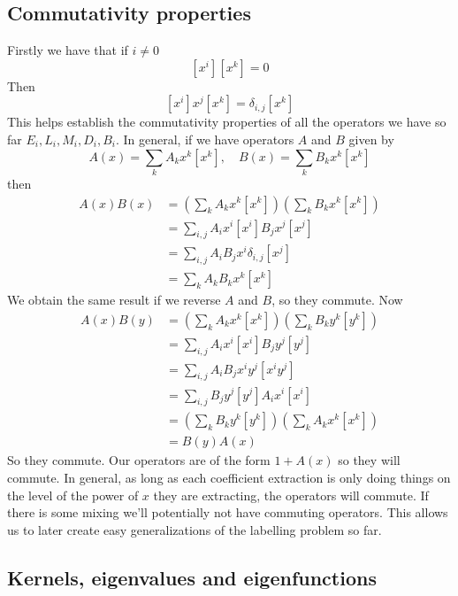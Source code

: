 \documentclass[12pt]{article}
\theoremstyle{definition} \newtheorem{definition}[theorem]{Definition}
\begin{document}
\subsection{Commutativity properties}
Firstly we have that if $i \neq 0$
\[
	[x^i][x^k] = 0
\]
Then
\[
	[x^i]x^j[x^k] = \delta_{i,j}[x^k]
\]
This helps establish the commutativity properties of all the operators we have so far $E_i, L_i, M_i, D_i, B_i$. In general, if we have operators $A$ and $B$ given by
\[
	A(x) = \sum_k A_k x^k[x^k],\quad B(x) = \sum_k B_k x^k[x^k]
\]
then
\begin{align*}
	A(x)B(x) &= \left(\sum_k A_k x^k[x^k]\right)\left(\sum_k B_k x^k[x^k]\right)\\
	& = \sum_{i,j}A_ix^i[x^i]B_jx^j[x^j] \\
	&= \sum_{i,j}A_iB_j x^i\delta_{i,j}[x^j]\\
	&= \sum_k A_kB_k x^k[x^k]
\end{align*}
We obtain the same result if we reverse $A$ and $B$, so they commute. Now
\begin{align*}
	A(x)B(y) &= \left(\sum_k A_k x^k[x^k]\right)\left(\sum_k B_k y^k[y^k]\right)\\
	& = \sum_{i,j}A_ix^i[x^i]B_jy^j[y^j]\\
	& = \sum_{i,j}A_iB_jx^iy^j[x^iy^j]\\
	& = \sum_{i,j}B_jy^j[y^j]A_ix^i[x^i]\\
	& = \left(\sum_k B_k y^k[y^k]\right)\left(\sum_k A_k x^k[x^k]\right)\\
	&  = B(y)A(x)
\end{align*}
So they commute. Our operators are of the form $1 + A(x)$ so they will commute. In general, as long as each coefficient extraction is only doing things on the level of the power of $x$ they are extracting, the operators will commute. If there is some mixing we'll potentially not have commuting operators. This allows us to later create easy generalizations of the labelling problem so far.
\subsection{Kernels, eigenvalues and eigenfunctions}
\end{document}
